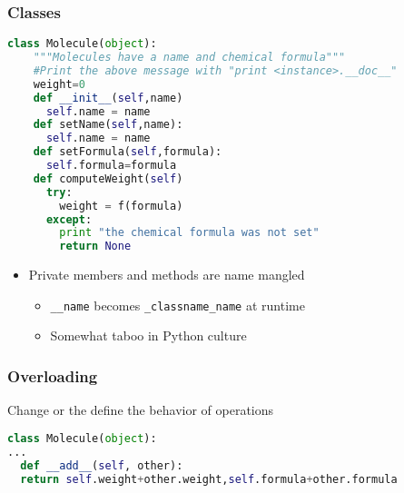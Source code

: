 \documentclass[xcolor=table,10pt,final]{beamer}
\begin{document}
\begin{frame}[fragile]
  \frametitle{Classes}
  \begin{lstlisting}[language=python]
  class Molecule(object):
    """Molecules have a name and chemical formula"""
    #Print the above message with "print <instance>.__doc__"
    weight=0
    def __init__(self,name)
      self.name = name
    def setName(self,name):
      self.name = name
    def setFormula(self,formula):
      self.formula=formula
    def computeWeight(self)
      try:
        weight = f(formula)
      except:
        print "the chemical formula was not set"
        return None
   \end{lstlisting}
   \begin{itemize}
     \item Private members and methods are name mangled
       \begin{itemize}
         \item \lstinline[language=python]|__name| becomes \lstinline[language=python]|_classname_name| at runtime
         \item Somewhat taboo in Python culture
       \end{itemize}
   \end{itemize}
\end{frame}

\begin{frame}[fragile]
  \frametitle{Overloading}
  Change or the define the behavior of operations
  \begin{lstlisting}[language=python]
class Molecule(object):
...
  def __add__(self, other):
  return self.weight+other.weight,self.formula+other.formula
  \end{lstlisting}
\end{frame}
\end{document}
